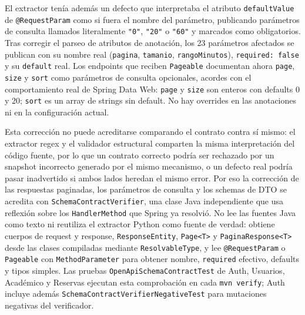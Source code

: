 El extractor tenía además un defecto que interpretaba el atributo
\texttt{defaultValue} de \texttt{@RequestParam} como si fuera el nombre del
parámetro, publicando parámetros de consulta llamados literalmente
\texttt{"0"}, \texttt{"20"} o \texttt{"60"} y marcados como obligatorios. Tras
corregir el parseo de atributos de anotación, los 23 parámetros afectados se
publican con su nombre real (\texttt{pagina}, \texttt{tamanio},
\texttt{rangoMinutos}), \texttt{required: false} y su \texttt{default} real. Los
endpoints que reciben \texttt{Pageable} documentan ahora \texttt{page},
\texttt{size} y \texttt{sort} como parámetros de consulta opcionales, acordes
con el comportamiento real de Spring Data Web: \texttt{page} y \texttt{size}
son enteros con defaults 0 y 20; \texttt{sort} es un array de strings sin
default. No hay overrides en las anotaciones ni en la configuración actual.

Esta corrección no puede acreditarse comparando el contrato contra sí mismo:
el extractor regex y el validador estructural comparten la misma
interpretación del código fuente, por lo que un contrato correcto podría ser
rechazado por un snapshot incorrecto generado por el mismo mecanismo, o un
defecto real podría pasar inadvertido si ambos lados heredan el mismo error.
Por eso la corrección de las respuestas paginadas, los parámetros de consulta
y los schemas de DTO se acredita con \texttt{SchemaContractVerifier}, una
clase Java independiente que usa reflexión sobre los \texttt{HandlerMethod}
que Spring ya resolvió. No lee las fuentes Java como texto ni reutiliza el
extractor Python como fuente de verdad: obtiene cuerpos de request y response,
\texttt{ResponseEntity}, \texttt{Page<T>} y \texttt{PaginaResponse<T>} desde
las clases compiladas mediante \texttt{ResolvableType}, y lee
\texttt{@RequestParam} o \texttt{Pageable} con \texttt{MethodParameter} para
obtener nombre, \texttt{required} efectivo, defaults y tipos simples. Las
pruebas \texttt{OpenApiSchemaContractTest} de Auth, Usuarios, Académico y
Reservas ejecutan esta comprobación en cada \texttt{mvn verify}; Auth incluye
además \texttt{SchemaContractVerifierNegativeTest} para mutaciones negativas
del verificador.

